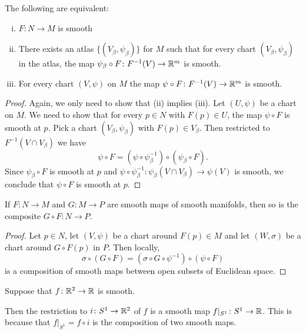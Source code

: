 \begin{frame}
  \begin{prop}
    The following are equivalent:
    \begin{enumerate}[(i)]
      \item $F \colon N \to M$ is smooth
      \item There exists an atlas $\{(V_\beta, \psi_\beta)\}$
        for $M$ such that for every chart $(V_\beta, \psi_\beta)$
        in the atlas, the map $\psi_\beta \circ F \colon F^{-1}(V) \to \mathbb R^m$
        is smooth.
      \item For every chart $(V, \psi)$ on $M$ the map
        $\psi \circ F \colon F^{-1}(V) \to \mathbb R^m$ is smooth.
    \end{enumerate}
  \end{prop}
  \begin{proof}
    Again, we only need to show that (ii) implies (iii).
    Let $(U, \psi)$ be a chart on $M$. We need to show that 
    for every $p \in N$ with $F(p) \in U$, the map $\psi \circ F$ is smooth
    at $p$. Pick a chart $(V_\beta, \psi_\beta)$ with $F(p) \in V_\beta$.
    Then restricted to $F^{-1}(V \cap V_{\beta})$ we have
    \begin{displaymath}
      \psi \circ F = (\psi \circ \psi_{\beta}^{-1}) \circ (\psi_\beta \circ F).
    \end{displaymath}
    Since $\psi_\beta \circ F$ is smooth at $p$ and
    $\psi \circ \psi_{\beta}^{-1} \colon \psi_{\beta}(V \cap V_{\beta}) \to \psi(V)$
    is smooth, we conclude that 
    $\psi \circ F$ is smooth at $p$.
  \end{proof}
\end{frame}
\begin{frame}
  \begin{prop}
    If $F \colon N \to M$ and $G \colon M \to P$
    are smooth maps of smooth manifolds, then so is 
    the composite $G \circ F \colon N \to P$.
  \end{prop}
  \begin{proof}
    Let $p \in N$, let $(V, \psi)$ be a chart around $F(p) \in M$ 
    and let $(W, \sigma)$ be a chart around $G \circ F(p)$ in $P$.
    Then locally,
    \begin{displaymath}
      \sigma \circ (G \circ F) = (\sigma \circ G \circ \psi^{-1}) \circ (\psi
      \circ F)
    \end{displaymath}
    is a composition of smooth maps between open subsets of Euclidean space.
  \end{proof}
  \begin{example}
    Suppose that $f \colon \mathbb R^2 \to \mathbb R$ is smooth.

    Then the restriction to $i \colon S^1 \to \mathbb R^2$ of
    $f$ is a smooth map $f \vert_{S^1} \colon S^1 \to \mathbb R$.
    This is because that $f \vert_{S^1}  = f \circ i$
    is the composition of two smooth maps.
  \end{example}
\end{frame}

